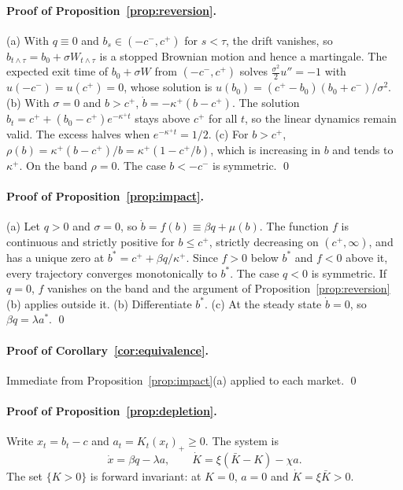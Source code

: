 \documentclass[12pt]{article}
\theoremstyle{definition}
\theoremstyle{remark}
\begin{document}
\paragraph{Proof of Proposition~\ref{prop:reversion}.}
(a) With $q\equiv0$ and $b_s\in(-c^-,c^+)$ for $s<\tau$, the drift vanishes, so $b_{t\wedge\tau}=b_0+\sigma W_{t\wedge\tau}$ is a stopped Brownian motion and hence a martingale. The expected exit time of $b_0+\sigma W$ from $(-c^-,c^+)$ solves $\frac{\sigma^2}{2}u''=-1$ with $u(-c^-)=u(c^+)=0$, whose solution is $u(b_0)=(c^+-b_0)(b_0+c^-)/\sigma^2$.
(b) With $\sigma=0$ and $b>c^+$, $\dot b=-\kappa^+(b-c^+)$. The solution $b_t=c^++(b_0-c^+)e^{-\kappa^+t}$ stays above $c^+$ for all $t$, so the linear dynamics remain valid. The excess halves when $e^{-\kappa^+t}=1/2$.
(c) For $b>c^+$, $\rho(b)=\kappa^+(b-c^+)/b=\kappa^+(1-c^+/b)$, which is increasing in $b$ and tends to $\kappa^+$. On the band $\rho=0$. The case $b<-c^-$ is symmetric. \qed

\paragraph{Proof of Proposition~\ref{prop:impact}.}
(a) Let $q>0$ and $\sigma=0$, so $\dot b=f(b)\equiv\beta q+\mu(b)$. The function $f$ is continuous and strictly positive for $b\le c^+$, strictly decreasing on $(c^+,\infty)$, and has a unique zero at $b^*=c^++\beta q/\kappa^+$. Since $f>0$ below $b^*$ and $f<0$ above it, every trajectory converges monotonically to $b^*$. The case $q<0$ is symmetric. If $q=0$, $f$ vanishes on the band and the argument of Proposition~\ref{prop:reversion}(b) applies outside it.
(b) Differentiate $b^*$.
(c) At the steady state $\dot b=0$, so $\beta q=\lambda a^*$. \qed

\paragraph{Proof of Corollary~\ref{cor:equivalence}.}
Immediate from Proposition~\ref{prop:impact}(a) applied to each market. \qed

\paragraph{Proof of Proposition~\ref{prop:depletion}.}
Write $x_t=b_t-c$ and $a_t=K_t(x_t)_+\ge0$. The system is
\[
\dot x=\beta q-\lambda a,\qquad \dot K=\xi(\bar K-K)-\chi a .
\]
The set $\{K>0\}$ is forward invariant: at $K=0$, $a=0$ and $\dot K=\xi\bar K>0$.
\end{document}
